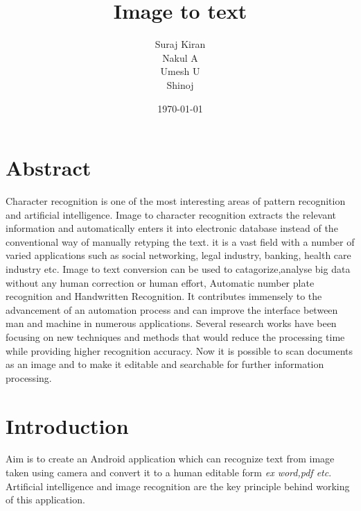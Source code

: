 \documentclass{article}
\title{Image to text} %
\author{Suraj Kiran\\Nakul A\\Umesh U\\Shinoj} %
\date{\today} %
\begin{document}
\maketitle %





\section{Abstract}

Character recognition is one of the most
interesting areas of pattern recognition and artificial
intelligence. Image to character recognition extracts
the relevant information and automatically enters it
into electronic database instead of the conventional
way of manually retyping the text. it is a vast field with a number of varied
applications such as social networking, legal industry,
banking, health care industry etc. Image to text conversion can be used to catagorize,analyse big data without any human correction or human
effort, Automatic number plate recognition and
Handwritten Recognition. It contributes
immensely to the advancement of an automation
process and can improve the interface between man
and machine in numerous applications. Several
research works have been focusing on new
techniques and methods that would reduce the
processing time while providing higher recognition
accuracy. Now it is possible to scan documents as an
image and to make it editable and searchable for
further information processing.


\section{Introduction}
Aim is to create an Android application which can recognize text from image taken using camera and convert it to a human editable form \textit{ex word,pdf etc}.\\
Artificial intelligence and image recognition are the key principle behind working of this application.
\end{document}
